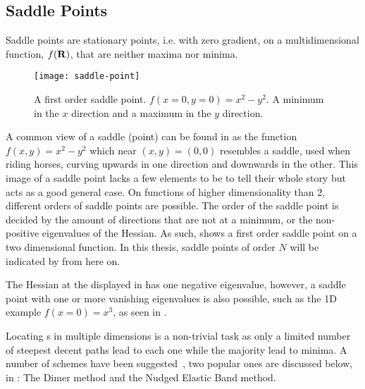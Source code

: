 \subsection{Saddle Points}
\label{sec:sps}

Saddle points are stationary points, i.e. with zero gradient, on a multidimensional function, $f({\mathrm{\mathbf{\bm{R}}}})$, that are neither maxima nor minima.

\begin{figure}[h]
  \begin{center}
    \texttt{[image: saddle-point]}
    \parbox{0.85\linewidth}{
      \caption{A first order saddle point.
      $f(x=0, y=0) = x^2 - y^2$. A minimum in the $x$ direction and a maximum in the $y$ direction.
      }
      \label{fig:2d-saddle-point}
    }
  \end{center}
\end{figure}

A common view of a saddle (point) can be found in  as the function $f(x, y) = x^2 - y^2$ which near $(x,y) = (0,0)$ resembles a saddle, used when riding horses, curving upwards in one direction and downwards in the other.
This image of a saddle point lacks a few elements to be to tell their whole story but acts as a good general case.
On functions of higher dimensionality than $2$, different orders of saddle points are possible.
The order of the saddle point is decided by the amount of directions that are not at a minimum, or the non-positive eigenvalues of the Hessian.
As such,  shows a first order saddle point on a two dimensional function.
In this thesis, saddle points of order $N$ will be indicated by  from here on.

The Hessian at the \sap{} displayed in  has one negative eigenvalue, however, a saddle point with one or more vanishing eigenvalues is also possible, such as the 1D example $f(x = 0) = x^3$, as seen in .

Locating \sap{}s in multiple dimensions is a non-trivial task as only a limited number of steepest decent paths lead to each one while the majority lead to minima.
A number of schemes have been suggested~\citemiss, two popular ones are discussed below, in : The Dimer method and the Nudged Elastic Band method.

